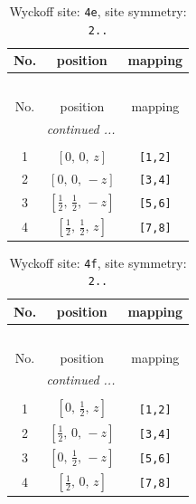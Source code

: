 \documentclass[fleqn,8pt]{jsarticle}
\begin{document}
\begin{longtable}{ccc}
\caption{Wyckoff site: {\tt 4e}, site symmetry: {\tt 2..}}
 \\
 \hline \hline
No. & position & mapping \\ \hline \endfirsthead

\multicolumn{2}{l}{\tablename\ \thetable{}} \\
 \hline \hline
No. & position & mapping \\ \hline \endhead

 \hline \hline
\multicolumn{2}{r}{\footnotesize\it continued ...} \\ \endfoot

 \hline \hline
\multicolumn{2}{r}{} \\ \endlastfoot

1 & $\left[ 0,\, 0,\, z \right]$ & {\tt [1,2]} \\ \hline
2 & $\left[ 0,\, 0,\, - z \right]$ & {\tt [3,4]} \\ \hline
3 & $\left[ \frac{1}{2},\, \frac{1}{2},\, - z \right]$ & {\tt [5,6]} \\ \hline
4 & $\left[ \frac{1}{2},\, \frac{1}{2},\, z \right]$ & {\tt [7,8]} \\
\end{longtable}
\renewcommand{\arraystretch}{1.2}
\begin{longtable}{ccc}
\caption{Wyckoff site: {\tt 4f}, site symmetry: {\tt 2..}}
 \\
 \hline \hline
No. & position & mapping \\ \hline \endfirsthead

\multicolumn{2}{l}{\tablename\ \thetable{}} \\
 \hline \hline
No. & position & mapping \\ \hline \endhead

 \hline \hline
\multicolumn{2}{r}{\footnotesize\it continued ...} \\ \endfoot

 \hline \hline
\multicolumn{2}{r}{} \\ \endlastfoot

1 & $\left[ 0,\, \frac{1}{2},\, z \right]$ & {\tt [1,2]} \\ \hline
2 & $\left[ \frac{1}{2},\, 0,\, - z \right]$ & {\tt [3,4]} \\ \hline
3 & $\left[ 0,\, \frac{1}{2},\, - z \right]$ & {\tt [5,6]} \\ \hline
4 & $\left[ \frac{1}{2},\, 0,\, z \right]$ & {\tt [7,8]} \\
\end{longtable}
\end{document}

